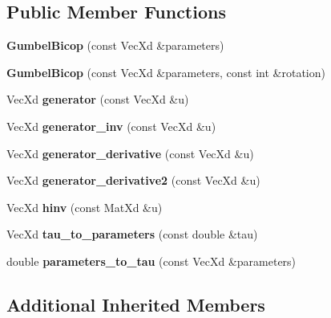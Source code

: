 \subsection*{Public Member Functions}
\begin{DoxyCompactItemize}
\item 
\hypertarget{class_gumbel_bicop_a96f6d7548161eefbc68999d52095eef3}{{\bfseries Gumbel\+Bicop} (const Vec\+Xd \&parameters)}\label{class_gumbel_bicop_a96f6d7548161eefbc68999d52095eef3}

\item 
\hypertarget{class_gumbel_bicop_a54f07cbf2630e03ddb81cbb1a07bbe9f}{{\bfseries Gumbel\+Bicop} (const Vec\+Xd \&parameters, const int \&rotation)}\label{class_gumbel_bicop_a54f07cbf2630e03ddb81cbb1a07bbe9f}

\item 
\hypertarget{class_gumbel_bicop_a7462d2e917ed8f9c7c768bc763062000}{Vec\+Xd {\bfseries generator} (const Vec\+Xd \&u)}\label{class_gumbel_bicop_a7462d2e917ed8f9c7c768bc763062000}

\item 
\hypertarget{class_gumbel_bicop_a1aac5fc1926ebb1a7a5477fea8eafc4e}{Vec\+Xd {\bfseries generator\+\_\+inv} (const Vec\+Xd \&u)}\label{class_gumbel_bicop_a1aac5fc1926ebb1a7a5477fea8eafc4e}

\item 
\hypertarget{class_gumbel_bicop_a04ad137cdb969fdcb38141dd55cc08ca}{Vec\+Xd {\bfseries generator\+\_\+derivative} (const Vec\+Xd \&u)}\label{class_gumbel_bicop_a04ad137cdb969fdcb38141dd55cc08ca}

\item 
\hypertarget{class_gumbel_bicop_ab86b728ad0f0db50711e25defc39a1ad}{Vec\+Xd {\bfseries generator\+\_\+derivative2} (const Vec\+Xd \&u)}\label{class_gumbel_bicop_ab86b728ad0f0db50711e25defc39a1ad}

\item 
\hypertarget{class_gumbel_bicop_a33500ea02a83efb50cf1d5e6f32b928a}{Vec\+Xd {\bfseries hinv} (const Mat\+Xd \&u)}\label{class_gumbel_bicop_a33500ea02a83efb50cf1d5e6f32b928a}

\item 
\hypertarget{class_gumbel_bicop_a0128ce09c2184f9b71f4b54c2790ed84}{Vec\+Xd {\bfseries tau\+\_\+to\+\_\+parameters} (const double \&tau)}\label{class_gumbel_bicop_a0128ce09c2184f9b71f4b54c2790ed84}

\item 
\hypertarget{class_gumbel_bicop_a6755267e48f12c29d943416c60e9f33f}{double {\bfseries parameters\+\_\+to\+\_\+tau} (const Vec\+Xd \&parameters)}\label{class_gumbel_bicop_a6755267e48f12c29d943416c60e9f33f}

\end{DoxyCompactItemize}
\subsection*{Additional Inherited Members}
